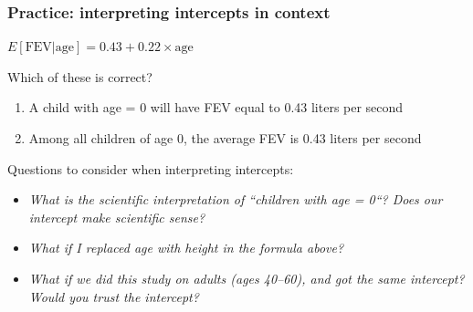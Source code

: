 \documentclass[12pt, 
hyperref={colorlinks=true, linkcolor=blue, urlcolor=cyan}]{beamer}
\begin{document}
\begin{frame}
\frametitle{Practice: interpreting intercepts in context}

\begin{center} $E[\text{FEV} | \text{age}] = 0.43 + 0.22 \times \text{age}$ \end{center} 

\vspace{-0.3cm} Which of these is correct? \vspace{-0.3cm}
\begin{enumerate}
\item A child with age = $0$ will have FEV equal to 0.43 liters per second
\item Among all children of age 0, the average FEV is 0.43 liters per second \vspace{-0.2cm}
\end{enumerate} \pause

\color{red} Questions to consider when interpreting intercepts: \vspace{-0.3cm} \color{black}
\begin{itemize}
\item \textit{What is the scientific interpretation of ``children with age = 0``? Does our intercept make scientific sense?} \\ \pause  %
\item \textit{What if I replaced age with height in the formula above?} \\ \pause %
\item \textit{What if we did this study on adults (ages 40--60), and got the same intercept? Would you trust the intercept?} %
\end{itemize}

\end{frame}
\end{document}
